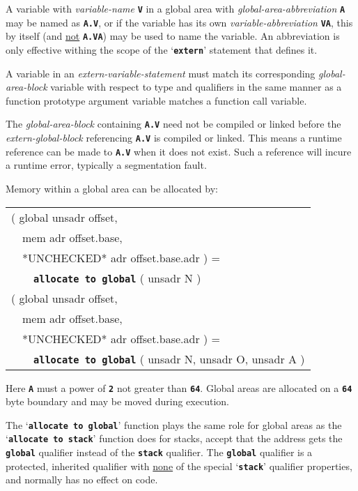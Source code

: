 \documentclass[12pt]{article}
\makeatletter
\newcommand{\TT}[1]{{\tt \bfseries #1}}
\newcommand{\ttkey}[1]{\TT{#1}\index{#1@{\tt #1}}}
\newenvironment{indpar}[1][0.3in]%
	{\begin{list}{}%
		     {\setlength{\itemsep}{0in}%
		      \setlength{\topsep}{0in}%
		      \setlength{\parsep}{1ex}%
		      \setlength{\labelwidth}{#1}%
		      \setlength{\leftmargin}{#1}%
		      \addtolength{\leftmargin}{\labelsep}}%
	 \item}%
	{\end{list}}
\makeatother
\begin{document}
A variable with {\em variable-name}
\TT{V} in a global area with {\em global-area-abbreviation}
\TT{A} may be named as \TT{A.V}, or if the variable has its own
{\em variable-abbreviation} \TT{VA},
this by itself (and \underline{not} \TT{A.VA})
may be used to name the variable.  An abbreviation is only effective
withing the scope of the `\TT{extern}' statement that defines it.

A variable in an
{\em extern-variable-statement} must match its corresponding
{\em global-area-block} variable with respect to type and qualifiers
in the same manner as a function prototype argument variable
matches a function call variable.

The {\em global-area-block} containing \TT{A.V} need not be compiled
or linked before the {\em extern-global-block} referencing
\TT{A.V} is compiled or linked.  This means a runtime reference
can be made to \TT{A.V} when it does not exist.  Such a reference
will incure a runtime error, typically a segmentation fault.

Memory within a global area can be allocated by:

\begin{indpar}\tt\begin{tabular}{l}
( global unsadr offset, \\
~~mem adr offset.base, \\
~~*UNCHECKED* adr offset.base.adr  ) = \\
~~~~\ttkey{allocate to global} ( unsadr N ) \\[1ex]
( global unsadr offset, \\
~~mem adr offset.base, \\
~~*UNCHECKED* adr offset.base.adr  ) = \\
~~~~\ttkey{allocate to global} ( unsadr N, unsadr O, unsadr A ) \\
\end{tabular}\end{indpar}\label{ALLOCATE-TO-GLOBAL}

Here \TT{A} must a power of \TT{2} not greater than \TT{64}.
Global areas are allocated on a \TT{64} byte boundary and
may be moved during execution.

The `\TT{allocate to global}' function plays the same role for
global areas as the `\TT{allocate to stack}' function does for
stacks, accept that the address gets the \TT{global} qualifier
instead of the \TT{stack} qualifier.  The \TT{global} qualifier
is a protected, inherited qualifier
with \underline{none} of the special `\TT{stack}'
qualifier properties, and normally has no effect on code.
\end{document}

